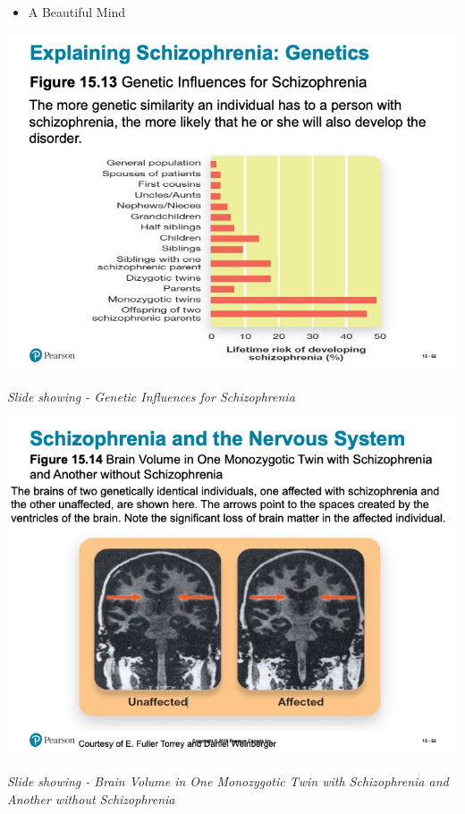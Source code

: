 \documentclass[
]{book}
\providecommand{\tightlist}{%
  \setlength{\itemsep}{0pt}\setlength{\parskip}{0pt}}
\begin{document}
\begin{reflect}
\begin{itemize}
\begin{itemize}
    \begin{itemize}
    \tightlist
    \item
      A Beautiful Mind
    \end{itemize}
  \end{itemize}
\end{itemize}

\includegraphics{assets/unit_10/slide_62.png}

\emph{Slide showing - Genetic Influences for Schizophrenia}

\includegraphics{assets/unit_10/slide_63.png}

\emph{Slide showing - Brain Volume in One Monozygotic Twin with Schizophrenia and Another without Schizophrenia}


\end{reflect}
\end{document}
